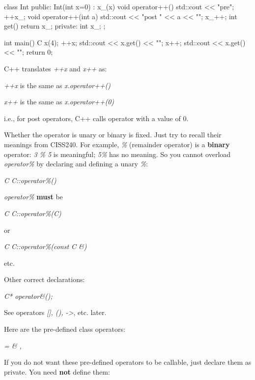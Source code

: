 \begin{consolethree}[escapeinside=||]
class Int
{
public:
    Int(int x=0)
        : x_(x)
    {}
    void operator++()
    {
        std::cout << "pre\n"; ++x_;
    }
    void operator++(int a)
    {
        std::cout << "post " << a << "\n"; x_++;
    }
    int get() { return x_; }
private:
    int x_;
};
\end{consolethree}

\begin{consolethree}[escapeinside=||]
int main()
{
    C x(4);
    ++x;
    std::cout << x.get() << "\n";
    x++;
    std::cout << x.get() << "\n";
    return 0;
}
\end{consolethree}

C++ translates \textit{++x} and \textit{x++} as:

\textit{++x} is the same as \textit{x.operator++()}

\textit{x++} is the same as \textit{x.operator++(0)}

i.e., for post operators, C++ calls operator with a value of 0.



\newpage{}

Whether the operator is unary or binary is fixed. Just try to recall
their meanings from CISS240. For example, \textit{\%} (remainder operator)
is a \textbf{binary} operator: \textit{3 \% 5} is meaningful; \textit{5\%}
has no meaning. So you cannot overload \textit{operator\%} by declaring
and defining a unary \textit{\%}:

\textit{C C::operator\%()}

\textit{operator\%} \textbf{must} be

\textit{C C::operator\%(C)}

or

\textit{C C::operator\%(const C \&)}

etc.

Other correct declarations:

\textit{C* operator\&();}

See operators \textit{[], (), ->}, etc. later.


\newpage{}

Here are the pre-defined class operators:

\textit{= \& ,}

If you do not want these pre-defined operators to be callable, just
declare them as private. You need \textbf{not} define them:


